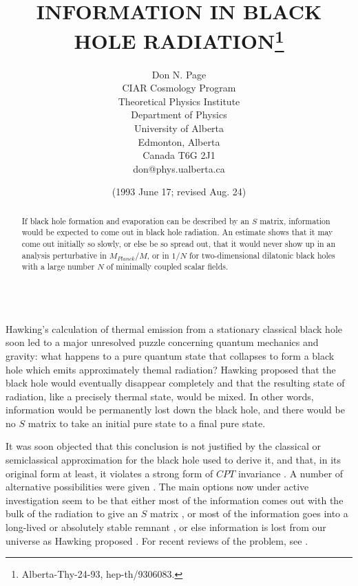 \documentclass[12pt]{article}
\begin{document}
\title{INFORMATION IN BLACK HOLE  RADIATION\thanks
{Alberta-Thy-24-93, hep-th/9306083.}}
\author{ Don N. Page\\
CIAR Cosmology Program\\
Theoretical Physics Institute\\
Department of Physics\\University of Alberta\\
Edmonton, Alberta\\Canada T6G 2J1\\
don@phys.ualberta.ca}
\date{(1993 June 17; revised Aug. 24)}
\maketitle
\large
\begin{abstract}
\baselineskip 16pt
     If black hole formation and evaporation can be described by an
$S$ matrix, information would be expected to come out in black hole
radiation.  An estimate shows that it
may come out initially so slowly, or else be so spread out,
that it would never show up in an analysis
perturbative in $M_{Planck}/M$, or in $1/N$ for
two-dimensional dilatonic black holes with a large number
$N$ of minimally coupled scalar fields.
\\
\\
\end{abstract}
\normalsize
\pagebreak
\baselineskip 15pt

	Hawking's calculation of thermal emission from a
stationary classical black hole \cite{Haw74,Haw76}
soon led to a major unresolved puzzle concerning quantum mechanics
and gravity:  what happens to a pure quantum state that collapses
to form a black hole which emits approximately themal radiation?
Hawking proposed \cite{Haw76} that the black hole would eventually
disappear completely and that the resulting state of radiation,
like a precisely thermal state, would be mixed.  In other words,
information would be permanently lost down the black hole,
and there would be no $S$ matrix to take an initial pure state
to a final pure state.

	    It was soon objected \cite{Zel77b,Pag80} that this
conclusion
is not justified by the classical or semiclassical approximation for
the
black hole used to derive it, and that, in its original form at
least, it
violates a strong form of $CPT$ invariance \cite{Pag80}.  A number of
alternative possibilities were given \cite{Pag80}.  The main options
now under active investigation seem to be that either most of the
information comes out with the bulk of the radiation to give an $S$
matrix
\cite{Pag80,Hoo,uni2DBH,STU}, or most of the information goes
into a long-lived \cite{ACN,Pre92} or absolutely stable remnant
\cite{BDDO'L}, or else information
is lost from our universe as Hawking proposed \cite{Haw76}.
For recent reviews of the problem, see
\cite{Pre92,HS,Gid92,Pag93,DanSch,Gid93}.
\end{document}
